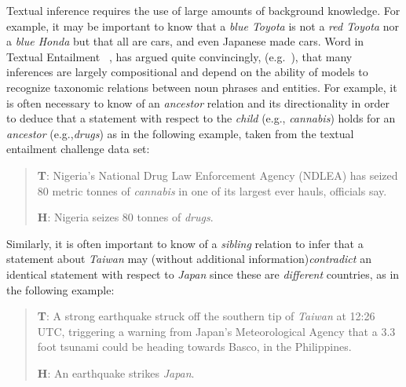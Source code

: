 
Textual inference requires the use of large amounts of background
knowledge. For example, it may be important to know that a {\em blue
  Toyota} is not a {\em red Toyota} nor a {\em blue Honda} but that
all are cars, and even Japanese made cars. Word in Textual Entailment
~\cite{DaganGlMa06,HaghighiNMa05,BGPRS05}, has argued quite
convincingly, (e.g.~\cite{maccartney-manning:2008:PAPERS}), that many
inferences are largely compositional and depend on the ability of
models to recognize taxonomic relations between noun phrases and entities. For example, it is often necessary to know of an {\em ancestor} relation and its directionality in order to deduce that a statement with respect to the {\em child} (e.g., {\em cannabis}) holds for an {\em ancestor} (e.g.,{\em drugs}) as in the following example, taken from the textual entailment
challenge data set:

{\small
  \begin{quote}
    {\bf T}: Nigeria's National Drug Law Enforcement Agency (NDLEA)
    has seized 80 metric tonnes of {\em cannabis} in one of its
    largest ever hauls, officials say.

    {\bf H}: Nigeria seizes 80 tonnes of {\em drugs}.
  \end{quote}
}

Similarly, it is often important to know of a {\em sibling} relation
to infer that a statement about {\em Taiwan} may (without additional information){\em contradict} an identical statement with respect to {\em Japan}  since these are {\em different} countries, as
in the following example:

{\small
  \begin{quote}

    {\bf T}: A strong earthquake struck off the southern tip of {\em
      Taiwan} at 12:26 UTC, triggering a warning from Japan's
    Meteorological Agency that a 3.3 foot tsunami could be heading
    towards Basco, in the Philippines.

    {\bf H}: An earthquake strikes {\em Japan}.
  \end{quote}
}

